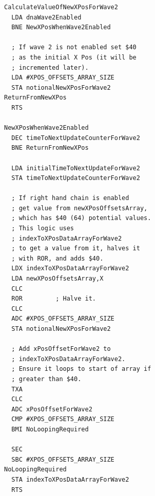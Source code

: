 \begin{minipage}[b]{0.55\linewidth}
\centering
\begin{lstlisting}[basicstyle=\tiny, caption=Calculate a notional X Pos value for Wave 2. This routine is called by the one on the
right\, its return value is \icode{notionalNewXPosForWave2}. ]
CalculateValueOfNewXPosForWave2
  LDA dnaWave2Enabled
  BNE NewXPosWhenWave2Enabled

  ; If wave 2 is not enabled set $40
  ; as the initial X Pos (it will be
  ; incremented later).
  LDA #XPOS_OFFSETS_ARRAY_SIZE
  STA notionalNewXPosForWave2
ReturnFromNewXPos   
  RTS

NewXPosWhenWave2Enabled   
  DEC timeToNextUpdateCounterForWave2
  BNE ReturnFromNewXPos

  LDA initialTimeToNextUpdateForWave2
  STA timeToNextUpdateCounterForWave2

  ; If right hand chain is enabled
  ; get value from newXPosOffsetsArray,
  ; which has $40 (64) potential values. 
  ; This logic uses 
  ; indexToXPosDataArrayForWave2 
  ; to get a value from it, halves it
  ; with ROR, and adds $40.
  LDX indexToXPosDataArrayForWave2
  LDA newXPosOffsetsArray,X
  CLC
  ROR         ; Halve it.
  CLC
  ADC #XPOS_OFFSETS_ARRAY_SIZE
  STA notionalNewXPosForWave2

  ; Add xPosOffsetForWave2 to
  ; indexToXPosDataArrayForWave2.
  ; Ensure it loops to start of array if
  ; greater than $40. 
  TXA
  CLC
  ADC xPosOffsetForWave2
  CMP #XPOS_OFFSETS_ARRAY_SIZE
  BMI NoLoopingRequired

  SEC
  SBC #XPOS_OFFSETS_ARRAY_SIZE
NoLoopingRequired   
  STA indexToXPosDataArrayForWave2
  RTS
\end{lstlisting}
\end{minipage}
\hspace{0.5cm}
